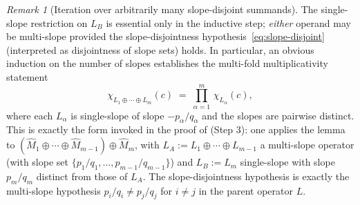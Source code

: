 \documentclass[aip,jmp,preprint,amsmath,amssymb,nofootinbib,floatfix]{revtex4-2}
\theoremstyle{plain}
\theoremstyle{definition}
\theoremstyle{remark}
\newtheorem{remark}[theorem]{Remark}
\begin{document}
\begin{remark}[Iteration over arbitrarily many slope-disjoint summands]
\label{rem:chi-mult-iteration}
The single-slope restriction on $L_B$ is essential only in the
inductive step; \emph{either} operand may be multi-slope provided the
slope-disjointness hypothesis~\eqref{eq:slope-disjoint} (interpreted as
disjointness of slope sets) holds. In particular, an obvious induction
on the number of slopes establishes the multi-fold multiplicativity
statement
\[
   \chi_{L_1 \oplus \cdots \oplus L_m}(c)
   \;=\;
   \prod_{\alpha=1}^{m}\, \chi_{L_\alpha}(c),
\]
where each $L_\alpha$ is single-slope of slope $-p_\alpha/q_\alpha$ and
the slopes are pairwise distinct. This is exactly the form invoked in
the proof of  (Step 3): one applies the lemma to
$(\widehat M_1 \oplus \cdots \oplus \widehat M_{m-1}) \oplus \widehat
M_m$, with $L_A := L_1 \oplus \cdots \oplus L_{m-1}$ a multi-slope
operator (with slope set $\{p_1/q_1, \dots, p_{m-1}/q_{m-1}\}$) and
$L_B := L_m$ single-slope with slope $p_m/q_m$ distinct from those of
$L_A$. The slope-disjointness hypothesis is exactly the multi-slope
hypothesis $p_i/q_i \neq p_j/q_j$ for $i \ne j$ in the parent operator
$L$.
\end{remark}
\end{document}
